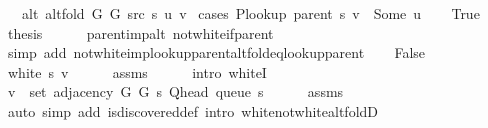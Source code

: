 \begin{isabellebody}
\ \ \ {\isachardoublequoteopen}alt\ {\isacharparenleft}{\kern0pt}alt{\isacharunderscore}{\kern0pt}fold\ G{}\ G{}\ src\ s{\isacharparenright}{\kern0pt}\ u\ v{\isachardoublequoteclose}\isanewline
%
\isadelimproof
%
\endisadelimproof
%
\isatagproof
{}\isamarkupfalse%
\ {\isacharparenleft}{\kern0pt}cases\ {\isachardoublequoteopen}P{\isacharunderscore}{\kern0pt}lookup\ {\isacharparenleft}{\kern0pt}parent\ s{\isacharparenright}{\kern0pt}\ v\ {\isacharequal}{\kern0pt}\ Some\ u{\isachardoublequoteclose}{\isacharparenright}{\kern0pt}\isanewline
\ \ \isamarkupfalse%
\ True\isanewline
\ \ \isamarkupfalse%
\ {\isacharquery}{\kern0pt}thesis\isanewline
\ \ \ \ \isamarkupfalse%
\ parent{\isacharunderscore}{\kern0pt}imp{\isacharunderscore}{\kern0pt}alt\ not{\isacharunderscore}{\kern0pt}white{\isacharunderscore}{\kern0pt}if{\isacharunderscore}{\kern0pt}parent\isanewline
\ \ \ \ \isamarkupfalse%
\ {\isacharparenleft}{\kern0pt}simp\ add{\isacharcolon}{\kern0pt}\ not{\isacharunderscore}{\kern0pt}white{\isacharunderscore}{\kern0pt}imp{\isacharunderscore}{\kern0pt}lookup{\isacharunderscore}{\kern0pt}parent{\isacharunderscore}{\kern0pt}alt{\isacharunderscore}{\kern0pt}fold{\isacharunderscore}{\kern0pt}eq{\isacharunderscore}{\kern0pt}lookup{\isacharunderscore}{\kern0pt}parent{\isacharparenright}{\kern0pt}\isanewline
{}\isamarkupfalse%
\isanewline
\ \ \isamarkupfalse%
\ False\isanewline
\ \ \isamarkupfalse%
\ {\isachardoublequoteopen}white\ s\ v{\isachardoublequoteclose}\isanewline
\ \ \ \ \isamarkupfalse%
\ assms\isanewline
\ \ \ \ \isamarkupfalse%
\ {\isacharparenleft}{\kern0pt}intro\ whiteI{\isacharparenright}{\kern0pt}\isanewline
\ \ \isamarkupfalse%
\ {\isachardoublequoteopen}v\ {\isasymin}\ set\ {\isacharparenleft}{\kern0pt}adjacency\ G{}\ G{}\ s\ {\isacharparenleft}{\kern0pt}Q{\isacharunderscore}{\kern0pt}head\ {\isacharparenleft}{\kern0pt}queue\ s{\isacharparenright}{\kern0pt}{\isacharparenright}{\kern0pt}{\isacharparenright}{\kern0pt}{\isachardoublequoteclose}\isanewline
\ \ \ \ \isamarkupfalse%
\ assms\isanewline
\ \ \ \ \isamarkupfalse%
\ {\isacharparenleft}{\kern0pt}auto\ simp\ add{\isacharcolon}{\kern0pt}\ is{\isacharunderscore}{\kern0pt}discovered{\isacharunderscore}{\kern0pt}def\ intro{\isacharcolon}{\kern0pt}\ white{\isacharunderscore}{\kern0pt}not{\isacharunderscore}{\kern0pt}white{\isacharunderscore}{\kern0pt}alt{\isacharunderscore}{\kern0pt}foldD{\isacharparenleft}{\kern0pt}{}{\isacharparenright}{\kern0pt}{\isacharparenright}{\kern0pt}\isanewline

\end{isabellebody}
